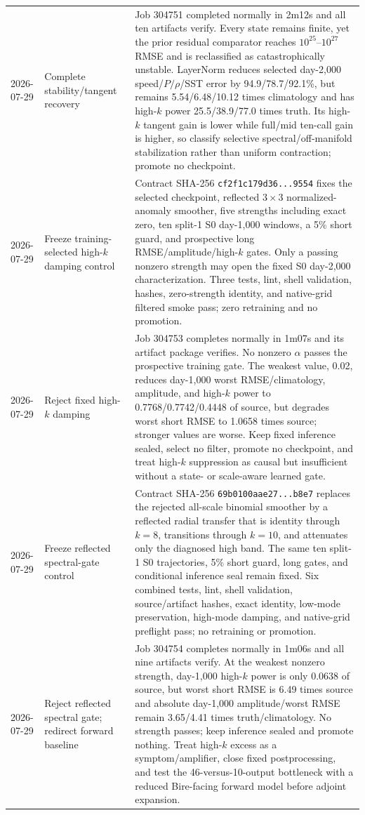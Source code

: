 \documentclass[11pt]{article}
\begin{document}
\begin{longtable}{@{}p{}p{}p{}@{}}
2026-07-29 & Complete stability/tangent recovery & Job 304751 completed normally in 2m12s and all ten artifacts verify.  Every state remains finite, yet the prior residual comparator reaches \(10^{25}\)--\(10^{27}\) RMSE and is reclassified as catastrophically unstable.  LayerNorm reduces selected day-2,000 speed/\(P/\rho\)/SST error by 94.9/78.7/92.1\%, but remains 5.54/6.48/10.12 times climatology and has high-\(k\) power 25.5/38.9/77.0 times truth.  Its high-\(k\) tangent gain is lower while full/mid ten-call gain is higher, so classify selective spectral/off-manifold stabilization rather than uniform contraction; promote no checkpoint. \\
2026-07-29 & Freeze training-selected high-\(k\) damping control & Contract SHA-256 \texttt{cf2f1c179d36...9554} fixes the selected checkpoint, reflected \(3\times3\) normalized-anomaly smoother, five strengths including exact zero, ten split-1 S0 day-1,000 windows, a 5\% short guard, and prospective long RMSE/amplitude/high-\(k\) gates.  Only a passing nonzero strength may open the fixed S0 day-2,000 characterization.  Three tests, lint, shell validation, hashes, zero-strength identity, and native-grid filtered smoke pass; zero retraining and no promotion. \\
2026-07-29 & Reject fixed high-\(k\) damping & Job 304753 completes normally in 1m07s and its artifact package verifies.  No nonzero \(\alpha\) passes the prospective training gate.  The weakest value, 0.02, reduces day-1,000 worst RMSE/climatology, amplitude, and high-\(k\) power to 0.7768/0.7742/0.4448 of source, but degrades worst short RMSE to 1.0658 times source; stronger values are worse.  Keep fixed inference sealed, select no filter, promote no checkpoint, and treat high-\(k\) suppression as causal but insufficient without a state- or scale-aware learned gate. \\
2026-07-29 & Freeze reflected spectral-gate control & Contract SHA-256 \texttt{69b0100aae27...b8e7} replaces the rejected all-scale binomial smoother by a reflected radial transfer that is identity through \(k=8\), transitions through \(k=10\), and attenuates only the diagnosed high band.  The same ten split-1 S0 trajectories, 5\% short guard, long gates, and conditional inference seal remain fixed.  Six combined tests, lint, shell validation, source/artifact hashes, exact identity, low-mode preservation, high-mode damping, and native-grid preflight pass; no retraining or promotion. \\
2026-07-29 & Reject reflected spectral gate; redirect forward baseline & Job 304754 completes normally in 1m06s and all nine artifacts verify.  At the weakest nonzero strength, day-1,000 high-\(k\) power is only 0.0638 of source, but worst short RMSE is 6.49 times source and absolute day-1,000 amplitude/worst RMSE remain 3.65/4.41 times truth/climatology.  No strength passes; keep inference sealed and promote nothing.  Treat high-\(k\) excess as a symptom/amplifier, close fixed postprocessing, and test the 46-versus-10-output bottleneck with a reduced Bire-facing forward model before adjoint expansion. \\

\end{longtable}
\end{document}

